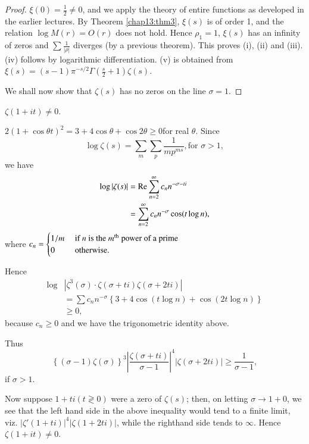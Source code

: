 \begin{proof}
$\xi (0) = \frac{1}{2} \neq 0$, and we apply the theory of entire
  functions as developed in the earlier lectures. By Theorem \ref{chap13:thm3}, $\xi
  (s)$ is of order 1, and the relation $\log M(r) = O(r)$ does not
  hold. Hence $\rho_1 =1$, $\xi(s)$ has an infinity of zeros and $\sum
  \frac{1}{|\rho|}$ diverges (by a previous theorem). This proves
  (i), (ii) and (iii). (iv) follows by logarithmic
  differentiation. (v) is obtained from $\xi (s) = (s-1) \pi^{-s/2}
  \Gamma (\frac{s}{2}+1) \zeta(s)$.
 

We shall now show that $\zeta(s)$ has no zeros on the line $\sigma
=1$. 
\end{proof}

\begin{thm}\cite[p.28]{key11}\label{chap13:thm5}
$\zeta (1+i t) \neq 0$.
\end{thm}

\medskip
{}
$2(1+\cos \theta t)^2 = 3 + 4 \cos \theta + \cos 2 \theta \geq
0$\pageoriginale for real $\theta$. Since
$$
\log \zeta(s) = \sum\limits_m \sum\limits_p \frac{1}{mp^{ms}}, \text{
  for } \sigma >1,
$$
we have
\begin{align*}
\log |\zeta(s)| & = \operatorname{Re} \sum\limits^\infty_{n=2} c_n n^{-\sigma - t
  i}\\
& = \sum\limits^\infty_{n=2} c_n n^{-\sigma } \cos (t \log n),
\end{align*}
where $c_n = \begin{cases}
1/m & \text{ if $n$ is the $m^{\rm th}$ power of a prime}\\
0 & \text{ otherwise}.
\end{cases}
$

Hence
\begin{align*}
\log & \left| \zeta^3 (\sigma) \cdot \zeta (\sigma + ti) \zeta (\sigma
+ 2 ti)\right|\\
& = \sum c_n n^{-\sigma} \left\{3+4 \cos (t \log n) + \cos (2t \log n)
\right\} \\
& \geq 0,
\end{align*}
because $c_n \geq 0$ and we have the trigonometric identity above.

Thus 
$$
\left\{(\sigma -1) \zeta (\sigma) \right\}^3 \left|\frac{\zeta(\sigma
  + ti)}{\sigma -1} \right|^4 |\zeta (\sigma + 2 ti)| \geq
\frac{1}{\sigma -1},
$$
if $\sigma >1$.

Now suppose $1+ti(t \gtrless 0)$ were a zero of $\zeta(s)$; then, on
letting $\sigma \to 1+0 $, we see that the left hand side in the above
inequality would tend to a finite limit, viz. $|\zeta'(1+ti)|^4
|\zeta(1+2ti)|$, while the right\pageoriginale hand side tends to
$\infty$. Hence $\zeta(1+it) \neq 0$.

